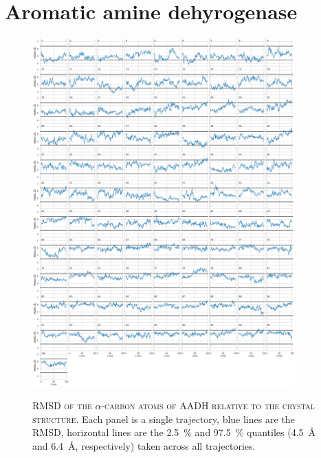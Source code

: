 \chapter{Aromatic amine dehyrogenase}\label{app:aadh}


\begin{figure}[ph!]
 \centering
 \caption[RMSD of the alpha-carbon atoms of AADH relative to the crystal structure]{\textsc{RMSD of the $\alpha$-carbon atoms of AADH relative to the crystal structure}. Each panel is a single trajectory, blue lines are the RMSD, horizontal lines are the \SI{2.5}{\percent} and \SI{97.5}{\percent} quantiles (\SI{4.5}{\angstrom} and \SI{6.4}{\angstrom}, respectively) taken across all trajectories.}
 \includegraphics[width=0.9\textwidth]{chapters/aadh/figures/rmsd_backbone_ca.png}
 \label{fig:rmsd_ca}
\end{figure}

